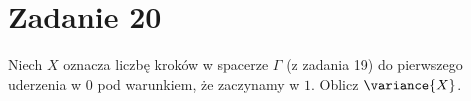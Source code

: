 \section[\nierozwiazane{Zadanie 20}]{Zadanie 20}
Niech \(X\) oznacza liczbę kroków w spacerze \(\Gamma\) (z zadania 19) do pierwszego uderzenia w \(0\)
pod warunkiem, że zaczynamy w \(1\). Oblicz \(\variance{X}\).

\brakrozwiazania
